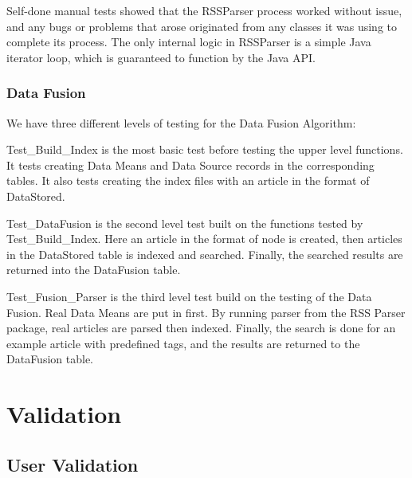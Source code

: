 \documentclass[10pt]{article} %
\begin{document}
Self-done manual tests showed that the RSSParser process worked without issue, and any bugs or problems that arose originated from any classes it was using to complete its process. The only internal logic in RSSParser is a simple Java iterator loop, which is guaranteed to function by the Java API.

\subsubsection{Data Fusion}

We have three different levels of testing for the Data Fusion Algorithm:

Test\_Build\_Index is the most basic test before testing the upper level functions. It tests creating Data Means and Data Source records in the corresponding tables. It also tests creating the index files with an article in the format of DataStored.

Test\_DataFusion is the second level test built on the functions tested by Test\_Build\_Index. Here an article in the format of node is created, then articles in the DataStored table is indexed and searched. Finally, the searched results are returned into the DataFusion table.

Test\_Fusion\_Parser is the third level test build on the testing of the Data Fusion. Real Data Means are put in first. By running parser from the RSS Parser package, real articles are parsed then indexed. Finally, the search is done for an example article with predefined tags, and the results are returned to the DataFusion table. 

\section{Validation}

\subsection{User Validation}
\end{document}
